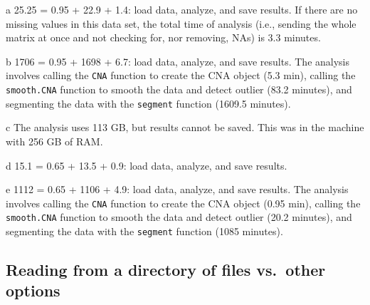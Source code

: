 \documentclass[a4paper,11pt]{article}
\begin{document}
\begin{center}
\begin{threeparttable}
\begin{tablenotes}
{     \item[a] 25.25 = 0.95 + 22.9 + 1.4: load data, analyze, and save
       results. %
      If there are no missing values in this data set, the total time of
      analysis (i.e., sending the whole matrix at once and not checking
      for, nor removing, NAs) is 3.3 minutes.
    \item[b] 1706 =  0.95 + 1698 + 6.7: load data, analyze, and save results. The
      analysis involves calling the \texttt{CNA} function to create the CNA object
      (5.3 min), calling the \texttt{smooth.CNA} function to smooth the data
      and detect outlier (83.2 minutes), and segmenting the data with the
      \texttt{segment} function (1609.5 minutes).
    \item[c] The analysis uses 113 GB, but results cannot be saved. This
      was in the machine with 256 GB of RAM.
     \item[d] 15.1 = 0.65 + 13.5 + 0.9: load data, analyze, and save
       results.
    \item[e] 1112 =  0.65 + 1106 + 4.9: load data, analyze, and save results. The
      analysis involves calling the \texttt{CNA} function to create the CNA object
      (0.95 min), calling the \texttt{smooth.CNA} function to smooth the data
      and detect outlier (20.2 minutes), and segmenting the data with the
      \texttt{segment} function (1085 minutes).

      }
  \end{tablenotes}

\end{threeparttable}
\end{center}




\clearpage
\subsection{Reading from a directory of files vs.\ other options}
\end{document}
